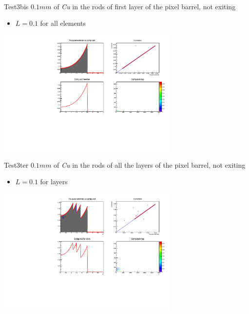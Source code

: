 \documentclass[pdftex, 11pt]{beamer}
\begin{document}
\begin{frame}
  \begin{block}{Test3bis}
    \alert{$0.1 mm$} of \emph{Cu}  in the rods of first layer of the pixel barrel, not exiting
    \begin{itemize}
    \item \alert{$L=0.1$} for all elements
    \end{itemize}
  \end{block}
  \begin{center}
    \includegraphics[width=9cm]{img/test3bis.pdf}
  \end{center}
\end{frame}

\begin{frame}
  \begin{block}{Test3ter}
    \alert{$0.1 mm$} of \emph{Cu}  in the rods of all the layers of the pixel barrel, not exiting
    \begin{itemize}
    \item \alert{$L=0.1$} for layers
    \end{itemize}
  \end{block}
  \begin{center}
    \includegraphics[width=9cm]{img/test3ter.pdf}
  \end{center}
\end{frame}
\end{document}
